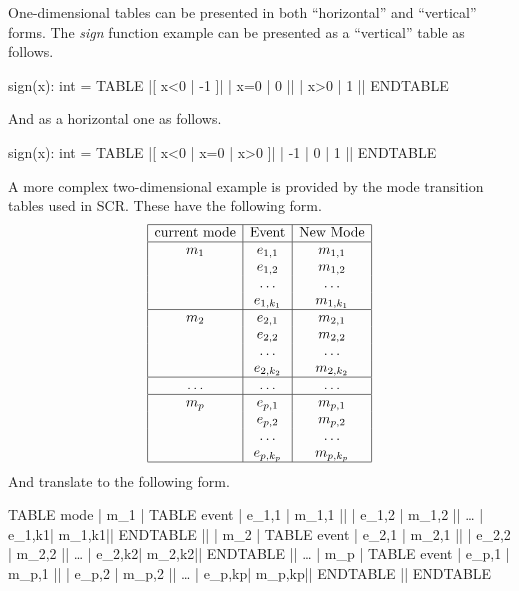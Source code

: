 One-dimensional tables can be presented in both ``horizontal'' and
``vertical'' forms.  The \emph{sign} function example can be
presented as a ``vertical'' table as follows.
\begin{pvsex}
  sign(x): int = TABLE 
                |[ x<0 | -1 ]|
                 | x=0 |  0 ||
                 | x>0 |  1 ||
   ENDTABLE
\end{pvsex}

And as a horizontal one as follows.
\begin{pvsex}
  sign(x): int = TABLE 
                 |[ x<0 | x=0 | x>0 ]|
                 |   -1 |  0  |  1  ||
   ENDTABLE
\end{pvsex}


A more complex two-dimensional example is provided by the mode
transition tables used in SCR\@.  These have the following form.
\[
\begin{array}{|c|c|c|}
\hline
\mbox{current mode} & \mbox{Event} & \mbox{New Mode} \\
\hline
m_{1} & e_{1,1} & m_{1,1} \\
    & e_{1,2} & m_{1,2} \\
    & \ldots & \ldots\\
    & e_{1,k_1} & m_{1,k_1} \\
\hline
m_{2} & e_{2,1} & m_{2,1} \\
    & e_{2,2} & m_{2,2} \\
    & \ldots & \ldots\\
    & e_{2,k_2} & m_{2,k_2} \\
\hline
\ldots  & \ldots & \ldots\\  
\hline
m_{p} & e_{p,1} & m_{p,1} \\
    & e_{p,2} & m_{p,2} \\
    & \ldots & \ldots\\
    & e_{p,k_p} & m_{p,k_p} \\
\hline
\end{array}
\]
And translate to the following form.
\smaller
\begin{center}
\begin{pvsex}
TABLE mode
     |  m\_1 | TABLE event
                  | e\_1,1 | m\_1,1 ||
                  | e\_1,2 | m\_1,2 ||
           \ldots
                  | e\_1,k1| m\_1,k1||
             ENDTABLE ||
     |  m\_2 | TABLE event
                  | e\_2,1 | m\_2,1 ||
                  | e\_2,2 | m\_2,2 ||
           \ldots
                  | e\_2,k2| m\_2,k2||
             ENDTABLE ||
        \ldots
     |  m\_p | TABLE event
                  | e\_p,1 | m\_p,1 ||
                  | e\_p,2 | m\_p,2 ||
           \ldots
                  | e\_p,kp| m\_p,kp||
             ENDTABLE ||
ENDTABLE
\end{pvsex}
\end{center}

